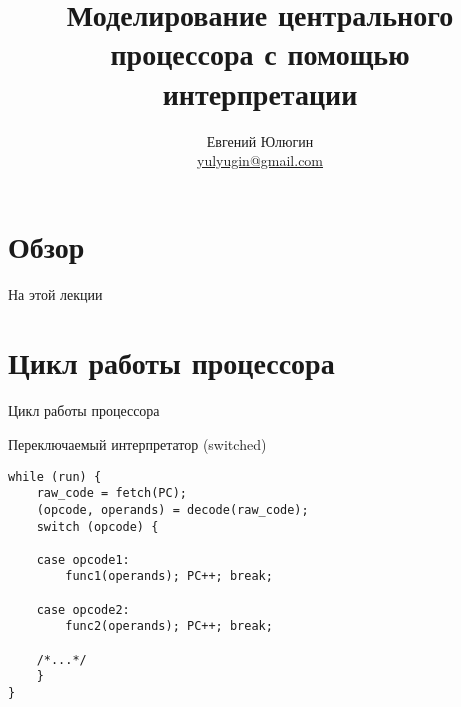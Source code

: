 

\newif\ifilab
\ilabtrue

\title{Моделирование центрального процессора с помощью интерпретации}
\author[Евгений Юлюгин]{Евгений Юлюгин \\ \small{\href{mailto:yulyugin@gmail.com}{yulyugin@gmail.com}}}



\begin{frame}
\titlepage
\end{frame}

\section*{Обзор}

\ifilab\else
\begin{frame}{На прошлой лекции}
\end{frame}
\fi

\begin{frame}{На этой лекции}
\tableofcontents
\end{frame} 


\section{Цикл работы процессора}

\begin{frame}{Цикл работы процессора}
\centering
{}
\end{frame}

\begin{frame}[fragile]{Переключаемый интерпретатор (switched)}
\begin{lstlisting}
while (run) {
    raw_code = fetch(PC);
    (opcode, operands) = decode(raw_code);
    switch (opcode) {

    case opcode1:
        func1(operands); PC++; break;

    case opcode2:
        func2(operands); PC++; break;

    /*...*/
    }
}
\end{lstlisting}
\end{frame}

\ifilab\else
\begin{frame}{Уточненный цикл работы}
\centering
\resizebox{9cm}{7cm}{
\inputpicture{interp-cycle-expanded-exception}
}
\end{frame}
\fi

